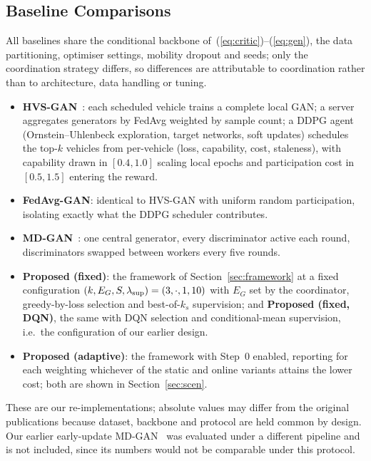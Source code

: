 \documentclass[journal]{IEEEtran}
\begin{document}
\subsection{Baseline Comparisons}
\label{sec:baselines}
All baselines share the conditional backbone of~(\ref{eq:critic})--(\ref{eq:gen}),
the data partitioning, optimiser settings, mobility dropout and seeds; only the
coordination strategy differs, so differences are attributable to coordination
rather than to architecture, data handling or tuning.
\begin{itemize}
\item \textbf{HVS-GAN}~\cite{wu2024hvsgan}: each scheduled vehicle trains a
      complete local GAN; a server aggregates generators by FedAvg weighted by
      sample count; a DDPG agent (Ornstein--Uhlenbeck exploration, target
      networks, soft updates) schedules the top-$k$ vehicles from per-vehicle
      (loss, capability, cost, staleness), with capability drawn in $[0.4,1.0]$
      scaling local epochs and participation cost in $[0.5,1.5]$ entering the
      reward.
\item \textbf{FedAvg-GAN}: identical to HVS-GAN with uniform random
      participation, isolating exactly what the DDPG scheduler contributes.
\item \textbf{MD-GAN}~\cite{hardy2019mdgan}: one central generator, every
      discriminator active each round, discriminators swapped between workers
      every five rounds.
\item \textbf{Proposed (fixed)}: the framework of Section~\ref{sec:framework}
      at a fixed configuration $(k,E_G,S,\lambda_{\rm sup})=(3,\cdot,1,10)$ with
      $E_G$ set by the coordinator, greedy-by-loss selection and
      best-of-$k_s$ supervision; and \textbf{Proposed (fixed, DQN)}, the same
      with DQN selection and conditional-mean supervision, i.e.\ the
      configuration of our earlier design.
\item \textbf{Proposed (adaptive)}: the framework with Step~0 enabled, reporting
      for each weighting whichever of the static and online variants attains
      the lower cost; both are shown in Section~\ref{sec:scen}.
\end{itemize}
These are our re-implementations; absolute values may differ from the original
publications because dataset, backbone and protocol are held common by design.
Our earlier early-update MD-GAN~\cite{kaleibar2025mascots} was evaluated under a
different pipeline and is not included, since its numbers would not be
comparable under this protocol.
\end{document}

